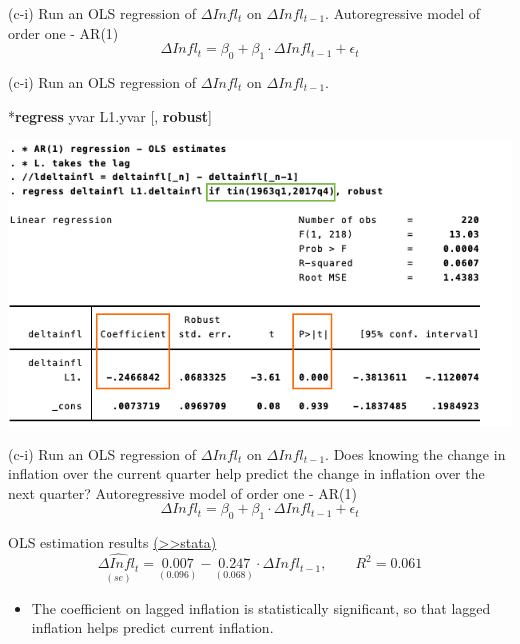 \documentclass[
  10pt,
  ignorenonframetext,
]{beamer}
\newenvironment{Shaded}{\begin{snugshade}}{\end{snugshade}}
\newcommand{\KeywordTok}[1]{\textcolor[rgb]{0.13,0.29,0.53}{\textbf{#1}}}
\newcommand{\NormalTok}[1]{#1}
\providecommand{\tightlist}{%
  \setlength{\itemsep}{0pt}\setlength{\parskip}{0pt}}
\begin{document}
\begin{frame}{(c-i) Run an OLS regression of \(\Delta Infl_t\) on
\(\Delta Infl_{t-1}\).}
\protect\hypertarget{c-i-run-an-ols-regression-of-delta-infl_t-on-delta-infl_t-1.}{}
Autoregressive model of order one - AR(1) \[
\Delta Infl_t = \beta_0 + \beta_1 \cdot \Delta Infl_{t-1} + \epsilon_t
\]
\end{frame}

\begin{frame}[fragile]{(c-i) Run an OLS regression of \(\Delta Infl_t\)
on \(\Delta Infl_{t-1}\).}
\protect\hypertarget{c-i-run-an-ols-regression-of-delta-infl_t-on-delta-infl_t-1.-1}{}
\small

\begin{Shaded}
\begin{Highlighting}[]
\NormalTok{*}\KeywordTok{regress}\NormalTok{ yvar L1.yvar [, }\KeywordTok{robust}\NormalTok{]}
\end{Highlighting}
\end{Shaded}

\begin{flushleft}\includegraphics[width=0.9\linewidth]{pictures/(c-i)AR1} \end{flushleft}
\end{frame}

\begin{frame}{(c-i) Run an OLS regression of \(\Delta Infl_t\) on
\(\Delta Infl_{t-1}\). Does knowing the change in inflation over the
current quarter \quad help predict the change in inflation over the next
quarter?}
\protect\hypertarget{AR1-A}{}
Autoregressive model of order one - AR(1) \[
\Delta Infl_t = \beta_0 + \beta_1 \cdot \Delta Infl_{t-1} + \epsilon_t
\]

OLS estimation results
\footnotesize \protect\hyperlink{AR1}{(\textgreater\textgreater stata)}
\normalsize \[
\underset{(se)}{\widehat{\Delta Infl_t}} = \underset{(0.096)}{0.007} -  \underset{(0.068)}{0.247} \cdot \Delta Infl_{t-1}, \qquad R^2=0.061
\]

\begin{itemize}
\tightlist
\item
  The coefficient on lagged inflation is statistically significant, so
  that lagged inflation helps predict current inflation.
\end{itemize}
\end{frame}
\end{document}
